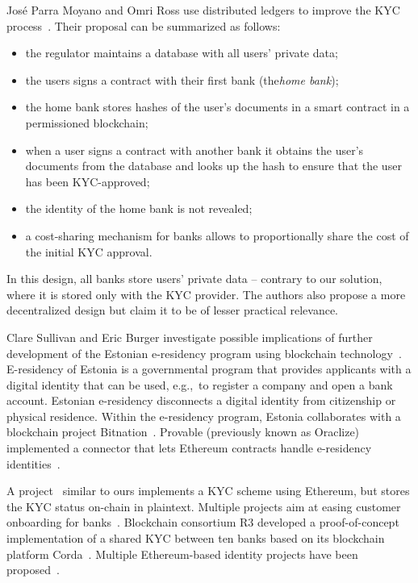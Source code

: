 Jos{\'{e}} Parra Moyano and Omri Ross use distributed ledgers to improve the KYC process~\cite{Moyano2017}.
Their proposal can be summarized as follows:
\begin{itemize}
	\item the regulator maintains a database with all users' private data;
	\item the users signs a contract with their first bank (the\textit{home bank});
	\item the home bank stores hashes of the user's documents in a smart contract in a permissioned blockchain;
	\item when a user signs a contract with another bank it obtains the user's documents from the database and looks up the hash to ensure that the user has been KYC-approved;
	\item the identity of the home bank is not revealed;
	\item a cost-sharing mechanism for banks allows to proportionally share the cost of the initial KYC approval.
\end{itemize}
In this design, all banks store users' private data -- contrary to our solution, where it is stored only with the KYC provider.
The authors also propose a more decentralized design but claim it to be of lesser practical relevance.

Clare Sullivan and Eric Burger investigate possible implications of further development of the Estonian e-residency program using blockchain technology~\cite{Sullivan2017}.
E-residency of Estonia is a governmental program that provides applicants with a digital identity that can be used, e.g.,~to register a company and open a bank account.
Estonian e-residency disconnects a digital identity from citizenship or physical residence.
Within the e-residency program, Estonia collaborates with a blockchain project Bitnation~\cite{Bitnation15, Estonia15}.
Provable (previously known as Oraclize) implemented a connector that lets Ethereum contracts handle e-residency identities~\cite{Provable}.

A project~\cite{Ohtamaa2016} similar to ours implements a KYC scheme using Ethereum, but stores the KYC status on-chain in plaintext.
Multiple projects aim at easing customer onboarding for banks~\cite{CambridgeBlockchain, KycChain, SnapSwap, Tradle}.
Blockchain consortium R3 developed a proof-of-concept implementation of a shared KYC between ten banks based on its blockchain platform Corda~\cite{Allison2016}.
Multiple Ethereum-based identity projects have been proposed~\cite{Mesropyan2017, Sovrin, Uport}.


